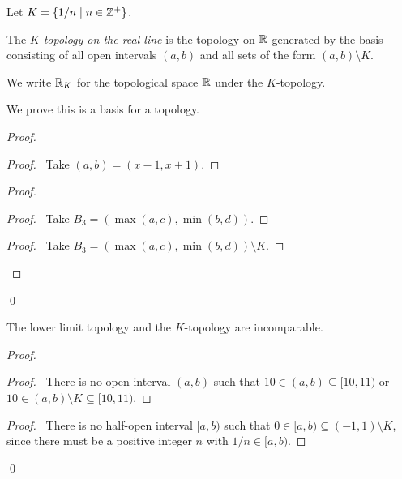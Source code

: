 \begin{definition}
    Let $K = \{ 1/n \mid n \in \mathbb{Z}^+ \}$.

    The \emph{$K$-topology on the real line} is the topology on $\mathbb{R}$ generated by the basis consisting of all open intervals
    $(a,b)$ and all sets of the form $(a,b) \setminus K$.

    We write $\mathbb{R}_K$ for the topological space $\mathbb{R}$ under the $K$-topology.
\end{definition}

We prove this is a basis for a topology.

\begin{proof}
    \pf
    \begin{proof}
        \pf\ Take $(a,b) = (x-1,x+1)$.
    \end{proof}
    \begin{proof}
        \begin{proof}
            \pf\ Take $B_3 = (\max (a,c), \min (b,d))$.
        \end{proof}
        \begin{proof}
            \pf\ Take $B_3 = (\max (a,c), \min (b,d)) \setminus K$.
        \end{proof}
    \end{proof}
    \qed
\end{proof}

\begin{lemma}
    The lower limit topology and the $K$-topology are incomparable.
\end{lemma}

\begin{proof}
    \pf
    \step{1}{The interval $[10,11)$ is not open in the $K$-topology.}
    \begin{proof}
        \pf\ There is no open interval $(a,b)$ such that $10 \in (a,b) \subseteq [10,11)$ or
        $10 \in (a,b) \setminus K \subseteq [10,11)$.
    \end{proof}
    \begin{proof}
        \pf\ There is no half-open interval $[a,b)$ such that $0 \in [a,b) \subseteq (-1,1) \setminus K$, since
        there must be a positive integer $n$ with $1/n \in [a,b)$.
    \end{proof}
    \qed
\end{proof}

